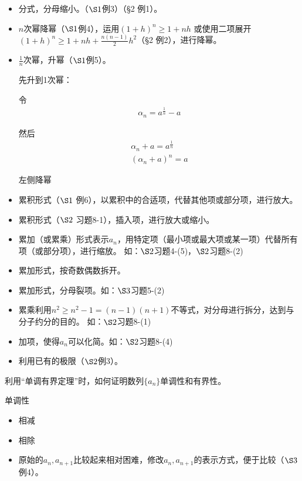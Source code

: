 \documentclass{article}
\begin{document}
\begin{itemize}
  \item 分式，分母缩小。（$\S 1$例3）（\S2 例1）。
  \item $n$次幂降幂（$\S 1$例4），运用$(1+h)^n \geq 1 + nh$
        或使用二项展开$(1+h)^n \geq 1 + nh + \frac{n(n-1)}{2}h^2$（\S2 例2），进行降幂。
  \item $\frac{1}{n}$次幂，升幂（$\S 1$例5）。

        先升到1次幂：

        令
        \begin{align*}
          \alpha_n = a^\frac{1}{n} - a
        \end{align*}

        然后
        \begin{align*}
          \alpha_n + a = a^\frac{1}{n} \\
          (\alpha_n + a)^n = a
        \end{align*}

        左侧降幂

  \item 累积形式（$\S 1$ 例6），以累积中的合适项，代替其他项或部分项，进行放大。
  \item 累积形式（$\S 2$ 习题8-1），插入项，进行放大或缩小。
  \item 累加（或累乘）形式表示$a_n$，用特定项（最小项或最大项或某一项）代替所有项（或部分项），进行缩放。
        如：$\S 2$习题4-(5)，$\S 2$习题8-(2)
  \item 累加形式，按奇数偶数拆开。
  \item 累加形式，分母裂项。如：$\S 3$习题5-(2)
  \item 累乘利用$n^2 \geq n^2 - 1 = (n - 1)(n + 1)$不等式，对分母进行拆分，达到与分子约分的目的。
        如：$\S 2$习题8-(1)
  \item 加项，使得$a_n$可以化简。如：$\S 2$习题8-(4)
  \item 利用已有的极限（$\S2$例3）。
\end{itemize}

\begin{zremark}
  利用“单调有界定理”时，如何证明数列$\{a_n\}$单调性和有界性。
\end{zremark}

单调性
\begin{itemize}
  \item 相减
  \item 相除
  \item 原始的$a_n, a_{n + 1}$比较起来相对困难，修改$a_n, a_{n + 1}$的表示方式，便于比较（$\S 3$例4）。
\end{itemize}
\end{document}
